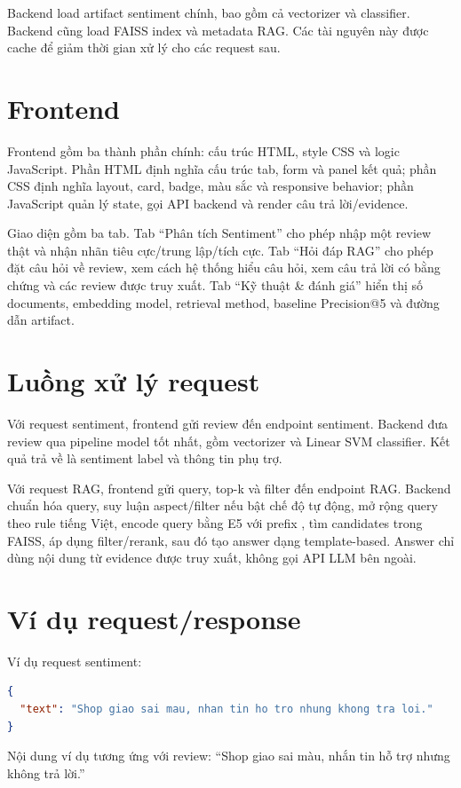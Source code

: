 Backend load artifact sentiment chính, bao gồm cả \TFIDF{} vectorizer và classifier. Backend cũng load FAISS index và metadata RAG. Các tài nguyên này được cache để giảm thời gian xử lý cho các request sau.

\section{Frontend}
Frontend gồm ba thành phần chính: cấu trúc HTML, style CSS và logic JavaScript. Phần HTML định nghĩa cấu trúc tab, form và panel kết quả; phần CSS định nghĩa layout, card, badge, màu sắc và responsive behavior; phần JavaScript quản lý state, gọi API backend và render câu trả lời/evidence.

Giao diện gồm ba tab. Tab “Phân tích Sentiment” cho phép nhập một review thật và nhận nhãn tiêu cực/trung lập/tích cực. Tab “Hỏi đáp RAG” cho phép đặt câu hỏi về review, xem cách hệ thống hiểu câu hỏi, xem câu trả lời có bằng chứng và các review được truy xuất. Tab “Kỹ thuật \& đánh giá” hiển thị số documents, embedding model, retrieval method, baseline Precision@5 và đường dẫn artifact.

\section{Luồng xử lý request}
Với request sentiment, frontend gửi review đến endpoint sentiment. Backend đưa review qua pipeline model tốt nhất, gồm \TFIDF{} vectorizer và Linear SVM classifier. Kết quả trả về là sentiment label và thông tin phụ trợ.

Với request RAG, frontend gửi query, top-k và filter đến endpoint RAG. Backend chuẩn hóa query, suy luận aspect/filter nếu bật chế độ tự động, mở rộng query theo rule tiếng Việt, encode query bằng E5 với prefix , tìm candidates trong FAISS, áp dụng filter/rerank, sau đó tạo answer dạng template-based. Answer chỉ dùng nội dung từ evidence được truy xuất, không gọi API LLM bên ngoài.

\section{Ví dụ request/response}
Ví dụ request sentiment:
\begin{lstlisting}[language=json]
{
  "text": "Shop giao sai mau, nhan tin ho tro nhung khong tra loi."
}
\end{lstlisting}
Nội dung ví dụ tương ứng với review: “Shop giao sai màu, nhắn tin hỗ trợ nhưng không trả lời.”

